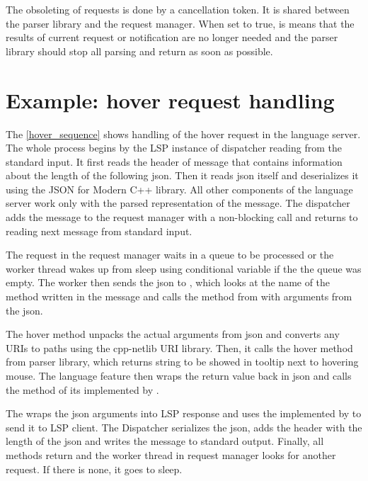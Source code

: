 The obsoleting of requests is done by a cancellation token. It is shared between the parser library and the request manager. When set to true, is means that the results of current request or notification are no longer needed and the parser library should stop all parsing and return as soon as possible.

\section{Example: hover request handling}

The \cref{hover_sequence} shows handling of the hover request in the language server. The whole process begins by the LSP instance of dispatcher reading from the standard input. It first reads the header of message that contains information about the length of the following json. Then it reads json itself and deserializes it using the JSON for Modern C++ library. All other components of the language server work only with the parsed representation of the message. The dispatcher adds the message to the request manager with a non-blocking call and returns to reading next message from standard input.

The request in the request manager waits in a queue to be processed or the worker thread wakes up from sleep using conditional variable if the the queue was empty. The worker then sends the json to , which looks at the name of the method written in the message and calls the method  from  with arguments from the json.

The hover method unpacks the actual arguments from json and converts any URIs to paths using the cpp-netlib URI library. Then, it calls the hover method from parser library, which returns string to be showed in tooltip next to hovering mouse. The language feature then wraps the return value back in json and calls the  method of its  implemented by .

The  wraps the json arguments into LSP response and uses the  implemented by  to send it to LSP client. The Dispatcher serializes the json, adds the header with the length of the json and writes the message to standard output. Finally, all methods return and the worker thread in request manager looks for another request. If there is none, it goes to sleep.

